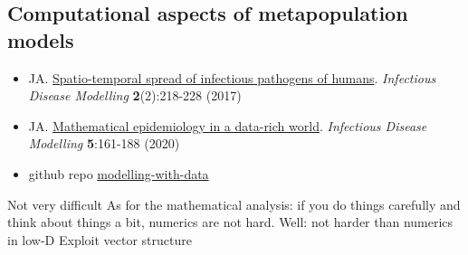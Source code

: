 \documentclass[aspectratio=169]{beamer}\usepackage[]{graphicx}\usepackage[]{xcolor}
\begin{document}




\subsection{Computational aspects of metapopulation models}

\begin{frame}
	\begin{itemize}
		\item JA. \href{https://doi.org/10.1016/j.idm.2017.05.001}{Spatio-temporal spread of infectious pathogens of humans}. \emph{Infectious Disease Modelling} \textbf{2}(2):218-228 (2017)
		\item JA. \href{https://doi.org/10.1016/j.idm.2019.12.008}{Mathematical epidemiology in a data-rich world}. \emph{Infectious Disease Modelling} \textbf{5}:161-188 (2020)
		\item github repo \href{https://github.com/julien-arino/modelling-with-data}{modelling-with-data}
	\end{itemize}
\end{frame}

\begin{frame}{Not very difficult}
As for the mathematical analysis: if you do things carefully and think about things a bit, numerics are not hard. Well: not harder than numerics in low-D
\vfill
Exploit vector structure
\end{frame}
\end{document}
